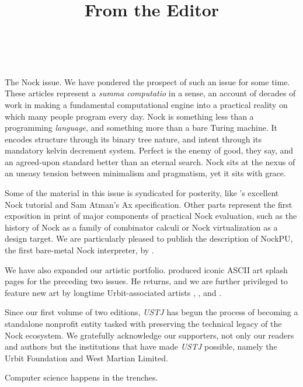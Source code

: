 \documentclass[twoside]{article}
\title{From the Editor}
\author{\authorname~\authorpatp \\ \affiliation}
\date{}
\begin{document}
\thispagestyle{firststyle}

\setcounter{page}{1}

The Nock issue.  We have pondered the prospect of such an issue for some time.  These articles represent a \textit{summa computatio} in a sense, an account of decades of work in making a fundamental computational engine into a practical reality on which many people program every day.  Nock is something less than a programming \textit{language}, and something more than a bare Turing machine.  It encodes structure through its binary tree nature, and intent through its mandatory kelvin decrement system.  Perfect is the enemy of good, they say, and an agreed-upon standard better than an eternal search.  Nock sits at the nexus of an uneasy tension between minimalism and pragmatism, yet it sits with grace.

Some of the material in this issue is syndicated for posterity, like 's excellent Nock tutorial and Sam Atman's Ax specification.  Other parts represent the first exposition in print of major components of practical Nock evaluation, such as the history of Nock as a family of combinator calculi or Nock virtualization as a design target.  We are particularly pleased to publish the description of NockPU, the first bare-metal Nock interpreter, by .

We have also expanded our artistic portfolio.   produced iconic ASCII art splash pages for the preceding two issues.  He returns, and we are further privileged to feature new art by longtime Urbit-associated artists , , and .

Since our first volume of two editions, \emph{USTJ} has begun the process of becoming a standalone nonprofit entity tasked with preserving the technical legacy of the Nock ecosystem.  We gratefully acknowledge our supporters, not only our readers and authors but the institutions that have made \emph{USTJ} possible, namely the Urbit Foundation and West Martian Limited.

Computer science happens in the trenches.  \tombstone{}
\end{document}
